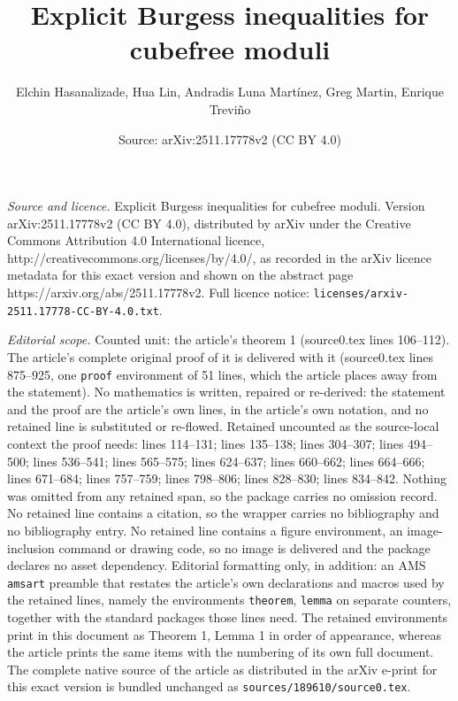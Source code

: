 \documentclass[10pt,a4paper]{amsart}
\title{Explicit Burgess inequalities for cubefree moduli}
\author{Elchin Hasanalizade, Hua Lin, Andradis Luna Mart\'inez, Greg Martin, Enrique Trevi{\~n}o}
\date{Source: arXiv:2511.17778v2 (CC BY 4.0)}
\begin{document}
\maketitle

\noindent\emph{Source and licence.} Explicit Burgess inequalities for cubefree moduli. Version arXiv:2511.17778v2 (CC BY 4.0), distributed by arXiv under the Creative Commons Attribution 4.0 International licence, http://creativecommons.org/licenses/by/4.0/, as recorded in the arXiv licence metadata for this exact version and shown on the abstract page https://arxiv.org/abs/2511.17778v2. Full licence notice: \texttt{licenses/arxiv-2511.17778-CC-BY-4.0.txt}.\par\smallskip

\noindent\textit{Editorial scope.} Counted unit: the article's theorem 1 (source0.tex lines 106--112). The article's complete original proof of it is delivered with it (source0.tex lines 875--925, one \texttt{proof} environment of 51 lines, which the article places away from the statement). No mathematics is written, repaired or re-derived: the statement and the proof are the article's own lines, in the article's own notation, and no retained line is substituted or re-flowed.  Retained uncounted as the source-local context the proof needs: lines 114--131; lines 135--138; lines 304--307; lines 494--500; lines 536--541; lines 565--575; lines 624--637; lines 660--662; lines 664--666; lines 671--684; lines 757--759; lines 798--806; lines 828--830; lines 834--842.  Nothing was omitted from any retained span, so the package carries no omission record.  No retained line contains a citation, so the wrapper carries no bibliography and no bibliography entry.  No retained line contains a figure environment, an image-inclusion command or drawing code, so no image is delivered and the package declares no asset dependency.  Editorial formatting only, in addition: an AMS \texttt{amsart} preamble that restates the article's own declarations and macros used by the retained lines, namely the environments \texttt{theorem}, \texttt{lemma} on separate counters, together with the standard packages those lines need.  The retained environments print in this document as Theorem 1, Lemma 1 in order of appearance, whereas the article prints the same items with the numbering of its own full document.  The complete native source of the article as distributed in the arXiv e-print for this exact version is bundled unchanged as \texttt{sources/189610/source0.tex}.
\end{document}
